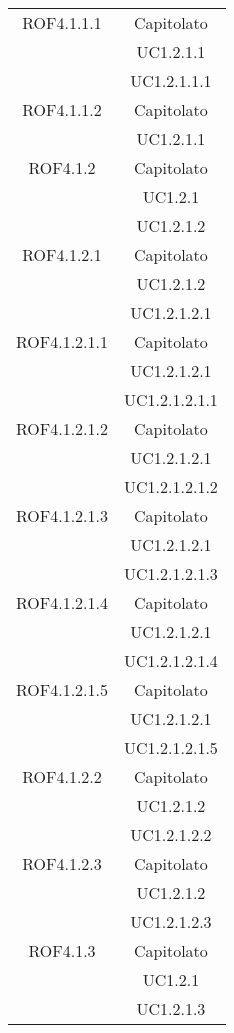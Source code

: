 \begin{longtable}{|c|c|}
\midrule
ROF4.1.1.1
& Capitolato\\
& UC1.2.1.1\\
& UC1.2.1.1.1\\

\midrule
ROF4.1.1.2
& Capitolato\\
& UC1.2.1.1\\

\midrule
ROF4.1.2
& Capitolato\\
& UC1.2.1\\
& UC1.2.1.2\\

\midrule
ROF4.1.2.1
& Capitolato\\
& UC1.2.1.2\\
& UC1.2.1.2.1\\

\midrule
ROF4.1.2.1.1
& Capitolato\\
& UC1.2.1.2.1\\
& UC1.2.1.2.1.1\\

\midrule
ROF4.1.2.1.2
& Capitolato\\
& UC1.2.1.2.1\\
& UC1.2.1.2.1.2\\

\midrule
ROF4.1.2.1.3
& Capitolato\\
& UC1.2.1.2.1\\
& UC1.2.1.2.1.3\\

\midrule
ROF4.1.2.1.4
& Capitolato\\
& UC1.2.1.2.1\\
& UC1.2.1.2.1.4\\

\midrule
ROF4.1.2.1.5
& Capitolato\\
& UC1.2.1.2.1\\
& UC1.2.1.2.1.5\\

\midrule
ROF4.1.2.2
& Capitolato\\
& UC1.2.1.2\\
& UC1.2.1.2.2\\

\midrule
ROF4.1.2.3
& Capitolato\\
& UC1.2.1.2\\
& UC1.2.1.2.3\\

\midrule
ROF4.1.3
& Capitolato\\
& UC1.2.1\\
& UC1.2.1.3\\


\end{longtable}
